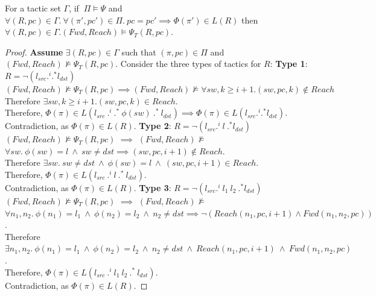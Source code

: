 \begin{theorem}[Completeness]
For a tactic set $\Gamma$, if $~\Pi \models \Psi$ and 
$\forall (R, pc) \in \Gamma. ~\forall(\pi', pc') \in \Pi. ~pc = pc' \implies \Phi(\pi') \in L(R)$
then $\forall (R, pc) \in \Gamma. (Fwd, Reach) \models \Psi_T(R, pc)$.
\end{theorem}
\iffull
\begin{proof}
	\textbf{Assume} $\exists (R, pc) \in \Gamma$ such that $(\pi, pc) \in \Pi$ and \newline 
	$(Fwd, Reach) \not\models \Psi_T(R,pc)$.
	Consider the three types of tactics for $R$: \newline
	\textbf{Type 1}: $R = \neg (l_{src} .^i .^* l_{dst})$ \newline
	$(Fwd, Reach) \not\models \Psi_T(R, pc) \implies (Fwd, Reach) \not\models \forall sw,k \geq i + 1. (sw,pc,k) \notin Reach$ \newline
	Therefore $\exists sw, k \geq i + 1. (sw,pc,k) \in Reach$. \\
	Therefore, $\Phi(\pi) \in L(l_{src}\ .^i \ .^* \ \phi(sw) \ .^* \ l_{dst}) \implies \Phi(\pi) \in L(l_{src} .^i .^* l_{dst}).$\\
	Contradiction, as $\Phi(\pi) \in L(R)$.
	\newline 
	\newline 
	\textbf{Type 2}: $R = \neg (l_{src} .^i \ l \ .^* l_{dst})$ \newline
	$(Fwd, Reach) \not\models \Psi_T(R, pc)$ $\implies$ $(Fwd, Reach) \not\models$ \newline $\forall sw.~ \phi(sw) = l ~\wedge~ sw \not= dst \implies  (sw, pc, i + 1) \notin Reach$. \\
	Therefore $\exists sw. \ sw \not= dst \ \wedge \ \phi(sw) = l \ \wedge \ (sw,pc,i+1) \in Reach$. \\
	Therefore, $\Phi(\pi) \in L( l_{src}\ .^i \ l \ .^* \ l_{dst})$. \\
	Contradiction, as $\Phi(\pi) \in L(R)$. 
	\newline  
	\newline
	\textbf{Type 3}: $R = \neg (l_{src} .^i \ l_1 \ l_2 \ .^* l_{dst})$ \newline
	$(Fwd, Reach) \not\models \Psi_T(R, pc)$ $\implies$ $(Fwd, Reach) \not\models$  \newline
	$\forall n_1, n_2.~\phi(n_1) = l_1~\wedge~ \phi(n_2) = l_2 ~\wedge~ n_2 \not=dst  \implies 
	\neg (Reach(n_1, pc, i + 1) \wedge Fwd(n_1, n_2, pc))$. \\
	Therefore $\exists n_1, n_2. ~\phi(n_1) = l_1~\wedge~ \phi(n_2) = l_2 ~\wedge~ n_2 \not=dst ~\wedge~ Reach(n_1, pc, i + 1) ~\wedge~ Fwd(n_1, n_2, pc)$. \\
	Therefore, $\Phi(\pi) \in L(l_{src}\ .^i \ l_1~l_2 \ .^* \ l_{dst})$. \\
	Contradiction, as $\Phi(\pi) \in L(R)$.
\end{proof}
\fi

